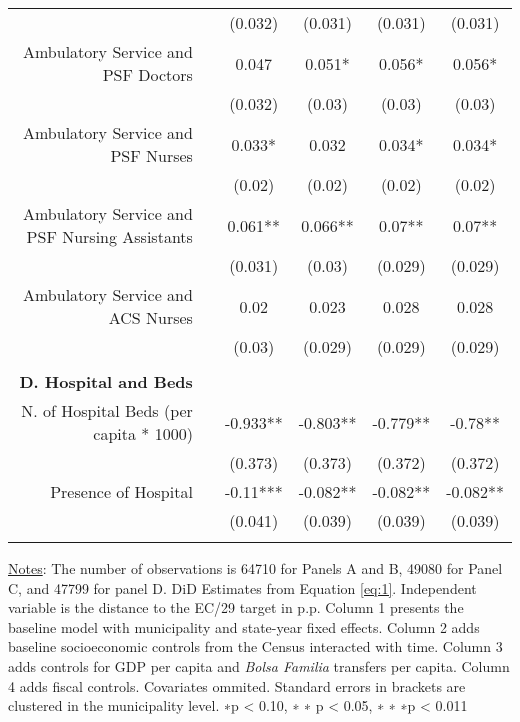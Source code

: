 \begin{table}[h!]
\begin{footnotesize}
\begin{center}
{\begin{threeparttable}[b]
\begin{tabular}{rrcccc}
          &       & (0.032) & (0.031) & (0.031) &  (0.031)  \\
    \multicolumn{1}{p{29.785em}}{Ambulatory Service and PSF Doctors} &       & 0.047 & 0.051* & 0.056* &  0.056*  \\
          &       & (0.032) & (0.03) & (0.03) &  (0.03)  \\
    \multicolumn{1}{p{29.785em}}{Ambulatory Service and PSF Nurses} &       & 0.033* & 0.032 & 0.034* &  0.034*  \\
          &       & (0.02) & (0.02) & (0.02) &  (0.02)  \\
    \multicolumn{1}{p{29.785em}}{Ambulatory Service and PSF Nursing Assistants} &       & 0.061** & 0.066** & 0.07** &  0.07**  \\
          &       & (0.031) & (0.03) & (0.029) &  (0.029)  \\
    \multicolumn{1}{p{29.785em}}{Ambulatory Service and ACS Nurses} &       & 0.02  & 0.023 & 0.028 &  0.028  \\
          &       & (0.03) & (0.029) & (0.029) &  (0.029)  \\
          &       &       &       &       &  \\
    \midrule
    \multicolumn{1}{p{29.785em}}{\textbf{D. Hospital and Beds}} &       &       &       &       &  \\
    \multicolumn{1}{p{29.785em}}{N. of Hospital Beds (per capita * 1000)} &       & -0.933** & -0.803** & -0.779** &  -0.78**  \\
          &       & (0.373) & (0.373) & (0.372) &  (0.372)  \\
    \multicolumn{1}{p{29.785em}}{Presence of Hospital} &       & -0.11*** & -0.082** & -0.082** &  -0.082**  \\
          &       & (0.041) & (0.039) & (0.039) &  (0.039)  \\
          &       &       &       &       &  \\
    \bottomrule
    \bottomrule
    \end{tabular}%
    
    
  \label{table:infra}%
  
  \begin{tablenotes}
  \scriptsize{\underline{Notes}: The number of observations is 64710 for Panels A and B,  49080 for Panel C, and 47799 for panel D.  DiD Estimates from Equation \ref{eq:1}. Independent variable is the distance to the EC/29 target in p.p. Column 1 presents the baseline model with municipality and state-year fixed effects. Column 2 adds baseline socioeconomic controls from the Census interacted with time. Column 3 adds controls for GDP per capita and \emph{Bolsa Familia} transfers per capita. Column 4 adds fiscal controls. Covariates ommited. Standard errors in brackets are clustered in the municipality level. ∗p < 0.10, ∗ ∗ p < 0.05, ∗ ∗ ∗p < 0.011}
  \end{tablenotes}

\end{threeparttable}
}
\end{center}
\end{footnotesize}
\end{table}